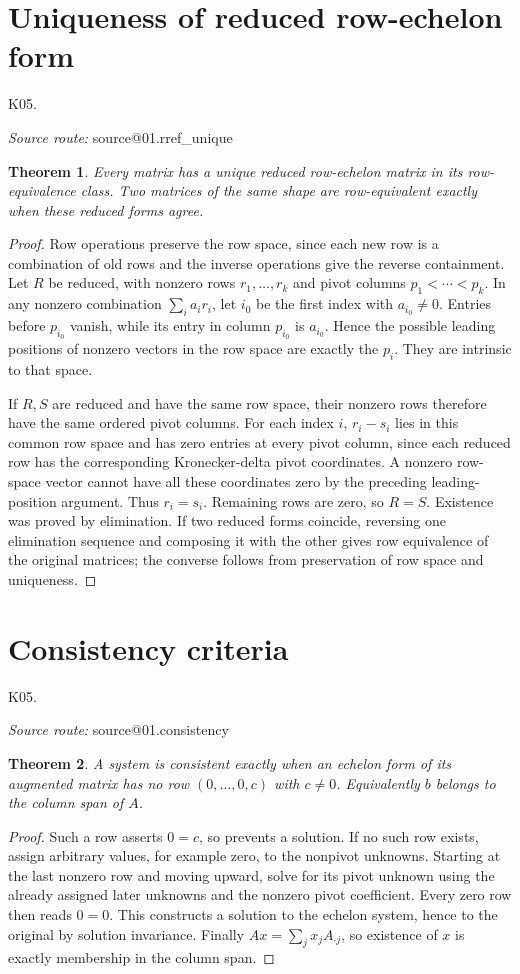 \documentclass[11pt,a4paper]{book}
\makeatletter
\newtheorem{theorem}{Theorem}[chapter]
\theoremstyle{definition}\newtheorem{definition}[theorem]{Definition}
\theoremstyle{remark}\newtheorem{remark}[theorem]{Remark}
\newcommand{\Kentry}[2]{\section{#2}\label{k:#1}\noindent\textsf{\small K05.\detokenize{#1}}\par
  \begingroup\small\color{black!65}\textit{Source route: }\csname source@#1\endcsname\par\endgroup}
\makeatother
\begin{document}
\Kentry{01.rref_unique}{Uniqueness of reduced row-echelon form}
\begin{theorem}
Every matrix has a unique reduced row-echelon matrix in its row-equivalence class. Two matrices of the same shape are row-equivalent exactly when these reduced forms agree.
\end{theorem}
\begin{proof}
Row operations preserve the row space, since each new row is a combination of old rows and the inverse operations give the reverse containment. Let $R$ be reduced, with nonzero rows $r_1,\ldots,r_k$ and pivot columns $p_1<\cdots<p_k$. In any nonzero combination $\sum_i a_i r_i$, let $i_0$ be the first index with $a_{i_0}\ne0$. Entries before $p_{i_0}$ vanish, while its entry in column $p_{i_0}$ is $a_{i_0}$. Hence the possible leading positions of nonzero vectors in the row space are exactly the $p_i$. They are intrinsic to that space.

If $R,S$ are reduced and have the same row space, their nonzero rows therefore have the same ordered pivot columns. For each index $i$, $r_i-s_i$ lies in this common row space and has zero entries at every pivot column, since each reduced row has the corresponding Kronecker-delta pivot coordinates. A nonzero row-space vector cannot have all these coordinates zero by the preceding leading-position argument. Thus $r_i=s_i$. Remaining rows are zero, so $R=S$. Existence was proved by elimination. If two reduced forms coincide, reversing one elimination sequence and composing it with the other gives row equivalence of the original matrices; the converse follows from preservation of row space and uniqueness.
\end{proof}

\Kentry{01.consistency}{Consistency criteria}
\begin{theorem}
A system is consistent exactly when an echelon form of its augmented matrix has no row $(0,\ldots,0,c)$ with $c\ne0$. Equivalently $b$ belongs to the column span of $A$.
\end{theorem}
\begin{proof}
Such a row asserts $0=c$, so prevents a solution. If no such row exists, assign arbitrary values, for example zero, to the nonpivot unknowns. Starting at the last nonzero row and moving upward, solve for its pivot unknown using the already assigned later unknowns and the nonzero pivot coefficient. Every zero row then reads $0=0$. This constructs a solution to the echelon system, hence to the original by solution invariance. Finally $Ax=\sum_jx_jA_{\cdot j}$, so existence of $x$ is exactly membership in the column span.
\end{proof}
\end{document}
